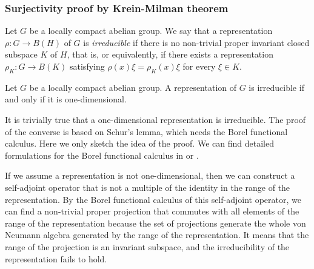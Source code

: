 \documentclass[a4paper]{article}
\begin{document}
\subsubsection*{Surjectivity proof by Krein-Milman theorem}
\fi


\begin{defn}
Let $G$ be a locally compact abelian group.
We say that a representation $\rho:G\to B(H)$ of $G$ is \emph{irreducible} if there is no non-trivial proper invariant closed subspace $K$ of $H$, that is, or equivalently, if there exists a representation $\rho_K:G\to B(K)$ satisfying $\rho(x)\xi=\rho_K(x)\xi$ for every $\xi\in K$.
\end{defn}
\begin{lem}
Let $G$ be a locally compact abelian group.
A representation of $G$ is irreducible if and only if it is one-dimensional.
\end{lem}
\begin{pf}
It is trivially true that a one-dimensional representation is irreducible.
The proof of the converse is based on Schur's lemma, which needs the Borel functional calculus.
Here we only sketch the idea of the proof.
We can find detailed formulations for the Borel functional calculus in \cite{murphy2014c} or \cite{conway2019course}.

If we assume a representation is not one-dimensional, then we can construct a self-adjoint operator that is not a multiple of the identity in the range of the representation.
By the Borel functional calculus of this self-adjoint operator, we can find a non-trivial proper projection that commutes with all elements of the range of the representation because the set of projections generate the whole von Neumann algebra generated by the range of the representation.
It means that the range of the projection is an invariant subspace, and the irreducibility of the representation fails to hold.
\end{pf}
\end{document}
